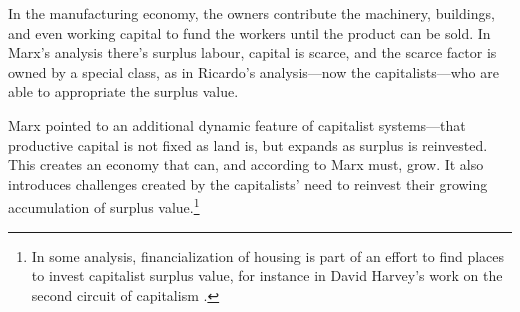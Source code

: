 In the manufacturing economy, the owners contribute the machinery, buildings, and even working capital to fund the workers until the product can be sold. %
In Marx's analysis there's surplus labour, capital is scarce, and the scarce factor is owned by a special class, as in Ricardo's analysis---now the capitalists---who are able to appropriate the surplus value. %

Marx pointed to an additional dynamic feature of capitalist systems---that productive capital is not fixed as land is, but  expands as surplus is reinvested. This creates an economy that can, and according to Marx must, grow. It also introduces challenges created by the capitalists' need to reinvest their growing accumulation of surplus value.\footnote{In some analysis, financialization of housing is part of an effort to find places to invest capitalist surplus value, for instance in David Harvey's work on the second circuit of capitalism \cite{GET_david_harvey}.} %


